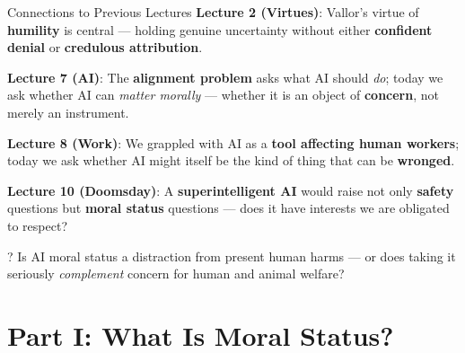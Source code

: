 \documentclass[aspectratio=169,11pt]{beamer}
\begin{document}
\begin{frame}{Connections to Previous Lectures}
\textbf{Lecture 2 (Virtues)}: Vallor's virtue of \textbf{humility} is central --- holding genuine uncertainty without either \textbf{confident denial} or \textbf{credulous attribution}.

\vspace{0.15cm}
\textbf{Lecture 7 (AI)}: The \textbf{alignment problem} asks what AI should \emph{do}; today we ask whether AI can \emph{matter morally} --- whether it is an object of \textbf{concern}, not merely an instrument.

\vspace{0.15cm}
\textbf{Lecture 8 (Work)}: We grappled with AI as a \textbf{tool affecting human workers}; today we ask whether AI might itself be the kind of thing that can be \textbf{wronged}.

\vspace{0.15cm}
\textbf{Lecture 10 (Doomsday)}: A \textbf{superintelligent AI} would raise not only \textbf{safety} questions but \textbf{moral status} questions --- does it have interests we are obligated to respect?

\begin{alertblock}{?}
Is AI moral status a distraction from present human harms --- or does taking it seriously \emph{complement} concern for human and animal welfare?
\end{alertblock}
\end{frame}

\section{Part I: What Is Moral Status?}
\end{document}
